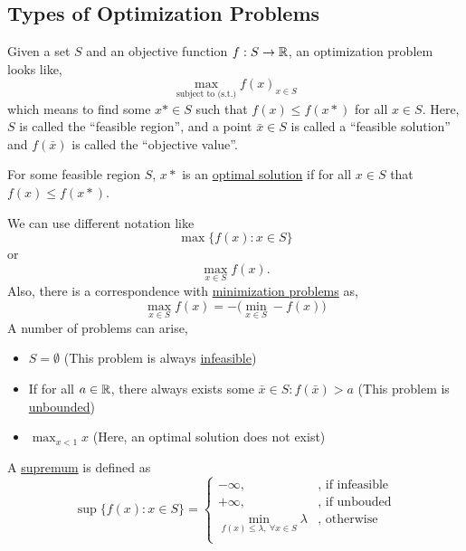 \documentclass[11pt]{article}
\begin{document}
\subsection{Types of Optimization Problems}
Given a set $S$ and an objective function $f: S \to \mathbb{R}$, an optimization problem
looks like,
\begin{equation*}
    \max_{\text{subject to (s.t.)}} f(x)_{x \in S}
\end{equation*}
which means to find some $x* \in S$ such that $f(x) \leq f(x*)$ for all $x \in
S$. Here, $S$ is called the ``feasible region'', and a point $\bar x \in S$ is
called a ``feasible solution'' and $f(\bar x)$ is called the ``objective
value''.
\begin{definition}
For some feasible region $S$, $x*$ is an \underline{optimal solution} if for all
$x \in S$ that $f(x) \leq f(x*)$.
\end{definition}
We can use different notation like
\begin{equation*}
    \max \{f(x) : x\in S \}
\end{equation*}
or
\begin{equation*}
    \max_{x \in S} f(x).
\end{equation*}
Also, there is a correspondence with \underline{minimization problems} as,
\begin{equation*}
    \max_{x \in S} f(x) = -\bigg( \min_{x \in S} -f(x) \bigg) 
\end{equation*}
A number of problems can arise,
\begin{itemize}
    \item $S = \emptyset$ (This problem is always \underline{infeasible})
	\item If for all $a \in \mathbb{R}$, there always exists some $\bar x \in S: f(\bar
		x) > a$ (This problem is \underline{unbounded})
    \item $\max_{x < 1} x$ (Here, an optimal solution does not exist)
\end{itemize}
\begin{definition}
    A \underline{supremum} is defined as \begin{equation*}
\sup\{f(x):x \in S\} =
    \begin{cases}
        - \infty,& \text{, if infeasible}\\
        + \infty,& \text{, if unbouded}\\
		\min_{f(x) \leq \lambda,\>\forall x \in S}\lambda &\text{,
		otherwise}\\
	\end{cases}
\end{equation*}
\end{definition}
\end{document}
